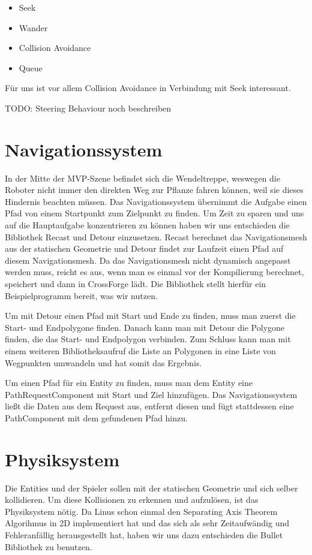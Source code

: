 \begin{itemize}
\item Seek
\item Wander
\item Collision Avoidance
\item Queue
\end{itemize}

Für uns ist vor allem Collision Avoidance in Verbindung mit Seek interessant.

TODO: Steering Behaviour noch beschreiben

\section{Navigationssystem}

In der Mitte der MVP-Szene befindet sich die Wendeltreppe, weswegen die Roboter nicht immer den direkten Weg zur Pflanze fahren können, weil sie dieses Hindernis beachten müssen. Das Navigationssystem übernimmt die Aufgabe einen Pfad von einem Startpunkt zum Zielpunkt zu finden. Um Zeit zu sparen und uns auf die Hauptaufgabe konzentrieren zu können haben wir uns entschieden die Bibliothek Recast und Detour einzusetzen. Recast berechnet das Navigationsmesh aus der statischen Geometrie und Detour findet zur Laufzeit einen Pfad auf diesem Navigationsmesh. Da das Navigationsmesh nicht dynamisch angepasst werden muss, reicht es aus, wenn man es einmal vor der Kompilierung berechnet, speichert und dann in CrossForge lädt. Die Bibliothek stellt hierfür ein Beispielprogramm bereit, was wir nutzen.

Um mit Detour einen Pfad mit Start und Ende zu finden, muss man zuerst die Start- und Endpolygone finden. Danach kann man mit Detour die Polygone finden, die das Start- und Endpolygon verbinden. Zum Schluss kann man mit einem weiteren Bibliotheksaufruf die Liste an Polygonen in eine Liste von Wegpunkten umwandeln und hat somit das Ergebnis.

Um einen Pfad für ein Entity zu finden, muss man dem Entity eine PathRequestComponent mit Start und Ziel hinzufügen. Das Navigationssystem ließt die Daten aus dem Request aus, entfernt diesen und fügt stattdessen eine PathComponent mit dem gefundenen Pfad hinzu.

\section{Physiksystem}

Die Entities und der Spieler sollen mit der statischen Geometrie und sich selber kollidieren. Um diese Kollisionen zu erkennen und aufzulösen, ist das Physiksystem nötig. Da Linus schon einmal den Separating Axis Theorem Algorihmus in 2D implementiert hat und das sich als sehr Zeitaufwändig und Fehleranfällig herausgestellt hat, haben wir uns dazu entschieden die Bullet Bibliothek zu benutzen. 

